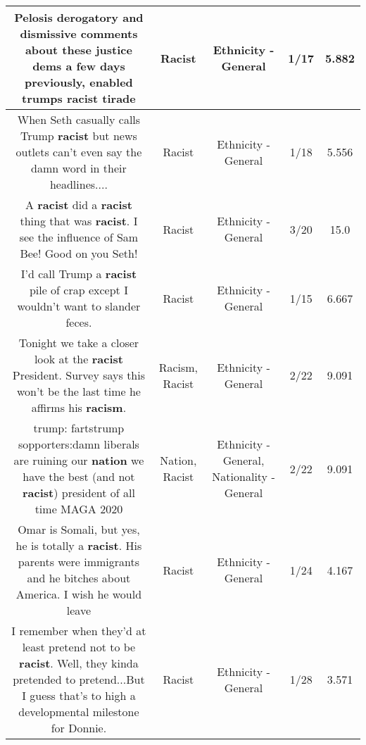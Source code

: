 \documentclass[11pt]{article}
\newlength\mylength
\begin{document}
\begin{center}
\begin{longtable}{|C{.65\mylength}|C{.30\mylength}|C{.12\mylength}|C{.12\mylength}|C{.12\mylength}|}
  \small Pelosis derogatory and dismissive comments about these justice dems a few days  previously, enabled trumps \textbf{racist} tirade\normalsize   & Racist & Ethnicity - General & 1/17 & 5.882 \\  \hline
  \small When Seth casually calls Trump \textbf{racist} but news outlets can't even say the damn word in their headlines....\normalsize   & Racist & Ethnicity - General & 1/18 & 5.556 \\  \hline
  \small A \textbf{racist} did a \textbf{racist} thing that was \textbf{racist}. I see the influence of Sam Bee! Good on you Seth!\normalsize   & Racist & Ethnicity - General & 3/20 & 15.0 \\  \hline
  \small I'd call Trump a \textbf{racist} pile of crap except I wouldn't want to slander feces.\normalsize   & Racist & Ethnicity - General & 1/15 & 6.667 \\  \hline
  \small Tonight we take a closer look at the \textbf{racist} President.  Survey says this won't be the last time he affirms his \textbf{racism}.\normalsize   & Racism, Racist & Ethnicity - General & 2/22 & 9.091 \\  \hline
  \small trump: fartstrump sopporters:damn liberals are ruining our \textbf{nation} we have the best (and not \textbf{racist}) president of all time MAGA 2020\normalsize   & Nation, Racist & Ethnicity - General, Nationality - General & 2/22 & 9.091 \\  \hline
  \small Omar is Somali, but yes, he is totally a \textbf{racist}. His parents were immigrants and he bitches about America. I wish he would leave\normalsize   & Racist & Ethnicity - General & 1/24 & 4.167 \\  \hline
  \small I remember when they'd at least pretend not to be \textbf{racist}. Well, they kinda pretended to pretend...But I guess that's to high a developmental milestone for Donnie.\normalsize   & Racist & Ethnicity - General & 1/28 & 3.571 \\  \hline

\end{longtable}
\end{center}
\end{document}

